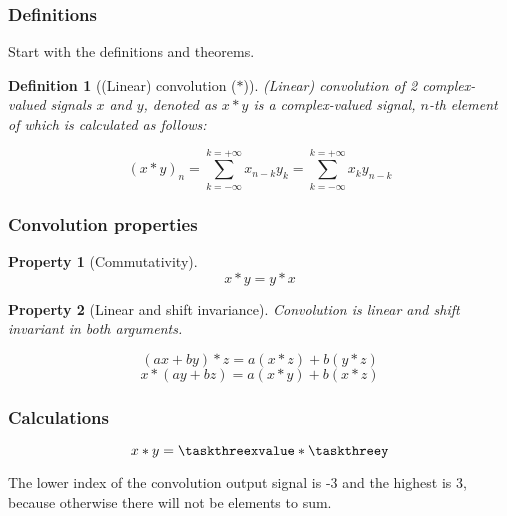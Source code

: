 \documentclass[a4paper]{article}
\theoremstyle{break}
\newtheorem{definition}{Definition}[section]
\theoremstyle{break}
\newtheorem{property}{Property}[section]
\begin{document}
\subsubsection*{Definitions}

Start with the definitions and theorems.

\begin{definition}[(Linear) convolution ($\ast$)]
  (Linear) convolution of 2 complex-valued signals $x$ and $y$, denoted as $x \ast y$ is a complex-valued signal, $n$-th element of which is calculated as follows:

  \begin{equation*}
    \left(x \ast y \right)_{n} = \sum_{k = -\infty} ^{k = +\infty} x_{n - k} y_k = \sum_{k = -\infty} ^{k = +\infty} x_k y_{n - k}
  \end{equation*}
\end{definition}

\subsubsection*{Convolution properties}

\begin{property}[Commutativity]
  \begin{equation*}
    x \ast y = y \ast x
  \end{equation*}
\end{property}

\begin{property}[Linear and shift invariance]
  Convolution is linear and shift invariant in both arguments.

  \begin{equation*}
    (a x + b y) \ast z = a (x \ast z) + b (y \ast z)
  \end{equation*}
  \begin{equation*}
    x \ast (a y + b z) = a (x \ast y) + b (x \ast z)
  \end{equation*}
\end{property}

\subsubsection*{Calculations}

\begin{equation*}
  x \ast y = \taskthreexvalue \ast \taskthreey
\end{equation*}

The lower index of the convolution output signal is -3 and the highest is 3, because otherwise there will not be elements to sum.
\end{document}
